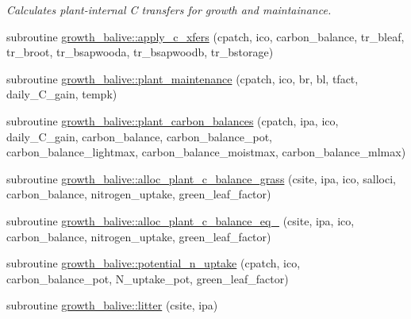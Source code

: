 \begin{DoxyCompactItemize}
\begin{DoxyCompactList}\small\item\em Calculates plant-\/internal C transfers for growth and maintainance. \end{DoxyCompactList}\item 
subroutine \hyperlink{namespacegrowth__balive_a7a91aeb819248834373b9c7d9bafcbde}{growth\+\_\+balive\+::apply\+\_\+c\+\_\+xfers} (cpatch, ico, carbon\+\_\+balance, tr\+\_\+bleaf, tr\+\_\+broot, tr\+\_\+bsapwooda, tr\+\_\+bsapwoodb, tr\+\_\+bstorage)
\item 
subroutine \hyperlink{namespacegrowth__balive_af977e6b599dfde9155a3ab3cb7175f16}{growth\+\_\+balive\+::plant\+\_\+maintenance} (cpatch, ico, br, bl, tfact, daily\+\_\+\+C\+\_\+gain, tempk)
\item 
subroutine \hyperlink{namespacegrowth__balive_a7921154a300d0b56c862c78f641e5d3b}{growth\+\_\+balive\+::plant\+\_\+carbon\+\_\+balances} (cpatch, ipa, ico, daily\+\_\+\+C\+\_\+gain, carbon\+\_\+balance, carbon\+\_\+balance\+\_\+pot, carbon\+\_\+balance\+\_\+lightmax, carbon\+\_\+balance\+\_\+moistmax, carbon\+\_\+balance\+\_\+mlmax)
\item 
subroutine \hyperlink{namespacegrowth__balive_aade95a53fd0d26aabf864afab17b1889}{growth\+\_\+balive\+::alloc\+\_\+plant\+\_\+c\+\_\+balance\+\_\+grass} (csite, ipa, ico, salloci, carbon\+\_\+balance, nitrogen\+\_\+uptake, green\+\_\+leaf\+\_\+factor)
\item 
subroutine \hyperlink{namespacegrowth__balive_abc5121207b9e02b869996c48e1204381}{growth\+\_\+balive\+::alloc\+\_\+plant\+\_\+c\+\_\+balance\+\_\+eq\+\_} (csite, ipa, ico, carbon\+\_\+balance, nitrogen\+\_\+uptake, green\+\_\+leaf\+\_\+factor)
\item 
subroutine \hyperlink{namespacegrowth__balive_a40618aa2149dae58efd79e039d0e51d4}{growth\+\_\+balive\+::potential\+\_\+n\+\_\+uptake} (cpatch, ico, carbon\+\_\+balance\+\_\+pot, N\+\_\+uptake\+\_\+pot, green\+\_\+leaf\+\_\+factor)
\item 
subroutine \hyperlink{namespacegrowth__balive_affc86c9f292d8fa6d67dfe1d0df69337}{growth\+\_\+balive\+::litter} (csite, ipa)
\end{DoxyCompactItemize}
